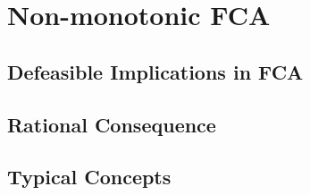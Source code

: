 \section{Non-monotonic FCA}
\label{section: non-monotonic fca}

\subsection{Defeasible Implications in FCA}
\label{subsection: defeasible implications in FCA}

\subsection{Rational Consequence}
\label{subsection: rational consequence}

\subsection{Typical Concepts}
\label{subsection: typical concepts}

